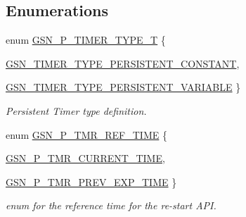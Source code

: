 \subsection*{Enumerations}
\begin{DoxyCompactItemize}
\item 
enum \hyperlink{a00671_gadc3540874fb3842b2eb56edd0c82945b}{GSN\_\-P\_\-TIMER\_\-TYPE\_\-T} \{ \par
\hyperlink{a00671_ggadc3540874fb3842b2eb56edd0c82945bac4338c7c860b0a33c9371d86d41b87c8}{GSN\_\-TIMER\_\-TYPE\_\-PERSISTENT\_\-CONSTANT}, 
\par
\hyperlink{a00671_ggadc3540874fb3842b2eb56edd0c82945bae46518ab7c9f147305e08200cf63b9ed}{GSN\_\-TIMER\_\-TYPE\_\-PERSISTENT\_\-VARIABLE}
 \}
\begin{DoxyCompactList}\small\item\em Persistent Timer type definition. \end{DoxyCompactList}\item 
enum \hyperlink{a00671_ga9aa5599a087c6080868052f86ecad7df}{GSN\_\-P\_\-TMR\_\-REF\_\-TIME} \{ \par
\hyperlink{a00671_gga9aa5599a087c6080868052f86ecad7dfa2ab194528197fe1eeed47e7efabb3701}{GSN\_\-P\_\-TMR\_\-CURRENT\_\-TIME}, 
\par
\hyperlink{a00671_gga9aa5599a087c6080868052f86ecad7dfad4c5b6ce85e5ffed6b4474dd639db19e}{GSN\_\-P\_\-TMR\_\-PREV\_\-EXP\_\-TIME}
 \}
\begin{DoxyCompactList}\small\item\em enum for the reference time for the re-\/start API. \end{DoxyCompactList}\end{DoxyCompactItemize}
